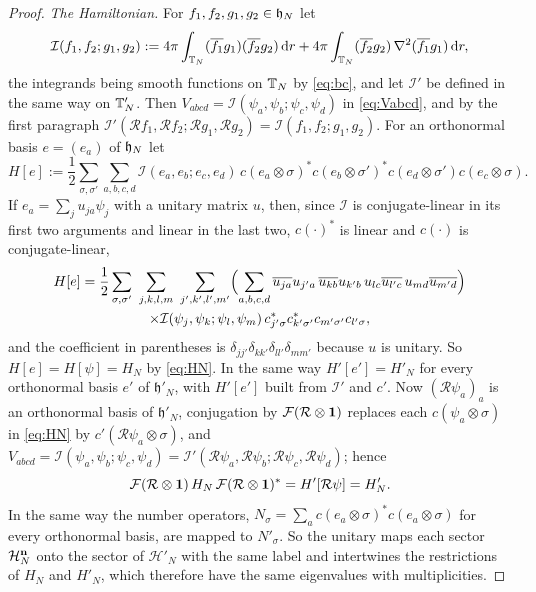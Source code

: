 \begin{proof}
\emph{The Hamiltonian.} For $f_1,f_2,g_1,g_2\in\mathfrak{h}_N$ let
\[
\mathcal I(f_1,f_2;g_1,g_2):=4\pi\int_{\mathbb{T}_N}(\overline{f_1}g_1)(\overline{f_2}g_2)\,\mathrm{d} r
+4\pi\int_{\mathbb{T}_N}(\overline{f_2}g_2)\,\nabla^2(\overline{f_1}g_1)\,\mathrm{d} r,
\]
the integrands being smooth functions on $\mathbb{T}_N$ by \eqref{eq:bc}, and let $\mathcal I'$ be defined in the same way on
$\mathbb{T}'_N$. Then $V_{abcd}=\mathcal I(\psi_a,\psi_b;\psi_c,\psi_d)$ in \eqref{eq:Vabcd}, and by the first paragraph
$\mathcal I'(\mathcal Rf_1,\mathcal Rf_2;\mathcal Rg_1,\mathcal Rg_2)=\mathcal I(f_1,f_2;g_1,g_2)$. For an orthonormal basis
$e=(e_a)$ of $\mathfrak{h}_N$ let
\[
H[e]:=\frac12\sum_{\sigma,\sigma'}\sum_{a,b,c,d}\mathcal I(e_a,e_b;e_c,e_d)\,c(e_a\otimes\sigma)^*c(e_b\otimes\sigma')^*
c(e_d\otimes\sigma')c(e_c\otimes\sigma).
\]
If $e_a=\sum_ju_{ja}\psi_j$ with a unitary matrix $u$, then, since $\mathcal I$ is conjugate-linear in its first two
arguments and linear in the last two, $c(\cdot)^*$ is linear and $c(\cdot)$ is conjugate-linear,
\begin{multline*}
H[e]=\frac12\sum_{\sigma,\sigma'}\ \sum_{j,k,l,m}\ \sum_{j',k',l',m'}\Bigl(\sum_{a,b,c,d}\overline{u_{ja}}u_{j'a}\,
\overline{u_{kb}}u_{k'b}\,u_{lc}\overline{u_{l'c}}\,u_{md}\overline{u_{m'd}}\Bigr)\\
\times\mathcal I(\psi_j,\psi_k;\psi_l,\psi_m)\,c^*_{j'\sigma}c^*_{k'\sigma'}c_{m'\sigma'}c_{l'\sigma},
\end{multline*}
and the coefficient in parentheses is $\delta_{jj'}\delta_{kk'}\delta_{ll'}\delta_{mm'}$ because $u$ is unitary. So
$H[e]=H[\psi]=H_N$ by \eqref{eq:HN}. In the same way $H'[e']=H'_N$ for every orthonormal basis $e'$ of
$\mathfrak h'_N$, with $H'[e']$ built from $\mathcal I'$ and $c'$. Now $(\mathcal R\psi_a)_a$ is an orthonormal basis of
$\mathfrak h'_N$, conjugation by $\mathcal{F}(\mathcal R\otimes\mathbf{1})$ replaces each $c(\psi_a\otimes\sigma)$ in \eqref{eq:HN} by
$c'(\mathcal R\psi_a\otimes\sigma)$, and $V_{abcd}=\mathcal I(\psi_a,\psi_b;\psi_c,\psi_d)=\mathcal I'(\mathcal R\psi_a,\mathcal R\psi_b;\mathcal R\psi_c,\mathcal R\psi_d)$;
hence
\[
\mathcal{F}(\mathcal R\otimes\mathbf{1})\,H_N\,\mathcal{F}(\mathcal R\otimes\mathbf{1})^*=H'[\mathcal R\psi]=H'_N .
\]
In the same way the number operators, $N_\sigma=\sum_ac(e_a\otimes\sigma)^*c(e_a\otimes\sigma)$ for every orthonormal basis,
are mapped to $N'_\sigma$. So the unitary maps each sector $\mathcal{H}_N^{\mathbf{n}}$ onto the sector of $\mathcal H'_N$ with the same
label and intertwines the restrictions of $H_N$ and $H'_N$, which therefore have the same eigenvalues with
multiplicities.
\end{proof}

